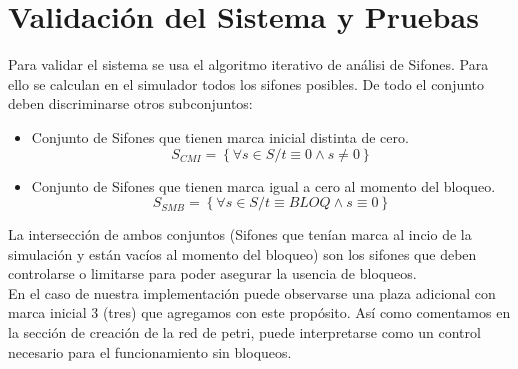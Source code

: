 \documentclass[12pt]{article} %
\begin{document}
\section{Validación del Sistema y Pruebas}
Para validar el sistema se usa el algoritmo iterativo de análisi de Sifones.
Para ello se calculan en el simulador todos los sifones posibles. De todo el conjunto deben discriminarse otros subconjuntos:
\begin{itemize}
\item Conjunto de Sifones que tienen marca inicial distinta de cero.
$$S_{CMI}=\left\{\forall s \in S / t\equiv 0 \wedge s\neq 0\right\}$$
\item Conjunto de Sifones que tienen marca igual a cero al momento del bloqueo.
$$S_{SMB}=\left\{\forall s \in S / t\equiv BLOQ \wedge s\equiv 0\right\}$$
\end{itemize}
La intersección de ambos conjuntos (Sifones que tenían marca al incio de la simulación y están vacíos al momento del bloqueo) son los sifones que deben controlarse o limitarse para poder asegurar la usencia de bloqueos.\\
En el caso de nuestra implementación puede observarse una plaza adicional con marca inicial 3 (tres) que agregamos con este propósito. Así como comentamos en la sección de creación de la red de petri, puede interpretarse como un control necesario para el funcionamiento sin bloqueos.
\begin{figure}[H] %
\label{fig:conjuntos}
\end{figure}
\end{document}
